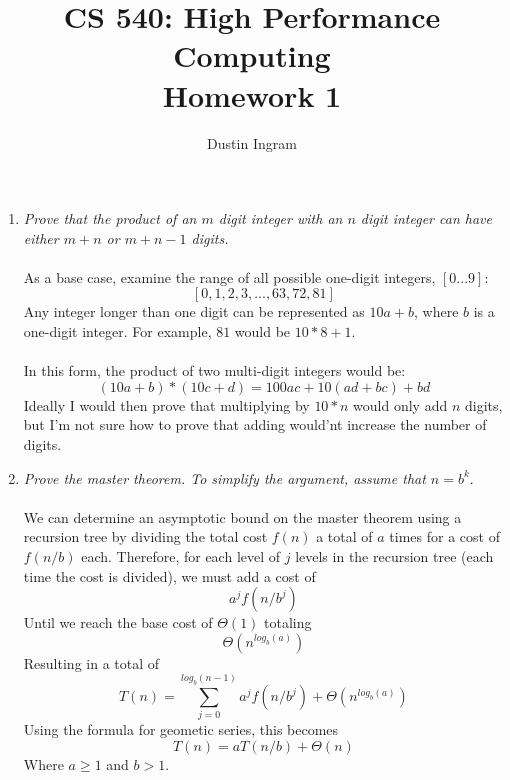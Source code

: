 \documentclass{article}
\title{CS 540: High Performance Computing \\ Homework 1}
\author{Dustin Ingram}
\begin{document}
\maketitle
\begin{enumerate}
\item \emph{Prove that the product of an $m$ digit integer with an $n$ digit integer can have either $m+n$ or $m+n-1$ digits.}\\\\
    As a base case, examine the range of all possible one-digit integers, $[0...9]$:\\
    $$[0,1,2,3,...,63,72,81]$$
    Any integer longer than one digit can be represented as $10a+b$, where $b$ is a one-digit integer. For example, $81$ would be $10*8+1$.\\\\
    In this form, the product of two multi-digit integers would be:
    $$(10a+b)*(10c+d) = 100ac+10(ad+bc)+bd$$
    Ideally I would then prove that multiplying by $10*n$ would only add $n$ digits, but I'm not sure how to prove that adding would'nt increase the number of digits.
\item \emph{Prove the master theorem. To simplify the argument, assume that $n=b^k$}.\\\\
    We can determine an asymptotic bound on the master theorem using a recursion tree by dividing the total cost $f(n)$ a total of $a$ times for a cost of $f(n/b)$ each. Therefore, for each level of $j$ levels in the recursion tree (each time the cost is divided), we must add a cost of 
    $$a^{j}f(n/b^{j})$$  
    Until we reach the base cost of $\Theta(1)$ totaling
    $$\Theta(n^{log_{b}(a)})$$
    Resulting in a total of
    $$T(n)=\displaystyle\sum\limits_{j=0}^{log_{b}(n-1)} a^{j}f(n/b^{j}) + \Theta(n^{log_{b}(a)})$$
    Using the formula for geometic series, this becomes
    $$T(n) = aT(n/b)+\Theta(n)$$
    Where $a\ge1$ and $b>1$. 
\end{enumerate}
\end{document}
